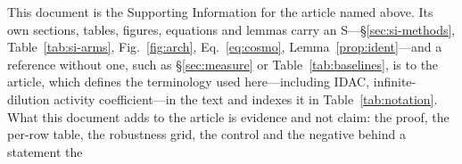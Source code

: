 \documentclass[journal=jcisd8,manuscript=suppinfo,layout=twocolumn]{achemso}
\begin{document}
\noindent
This document is the Supporting Information for the article named above. Its own
sections, tables, figures, equations and lemmas carry an S---\S\ref{sec:si-methods},
Table~\ref{tab:si-arms}, Fig.~\ref{fig:arch}, Eq.~\eqref{eq:cosmo},
Lemma~\ref{prop:ident}---and a reference without one, such as \S\ref{sec:measure} or
Table~\ref{tab:baselines}, is to the article, which defines the terminology used here---including
IDAC, infinite-dilution activity coefficient---in the text and indexes it in
Table~\ref{tab:notation}. What this document adds to the article is evidence and not claim: the
proof, the per-row table, the robustness grid, the control and the negative behind a statement the
\end{document}
